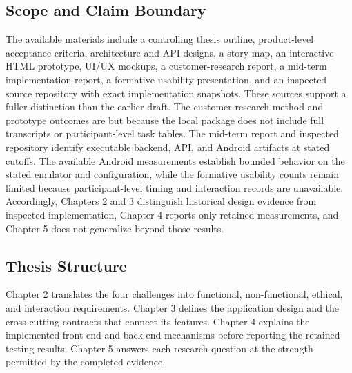 \subsection{Scope and Claim Boundary}

The available materials include a controlling thesis outline, product-level acceptance criteria, architecture and API designs, a story map, an interactive HTML prototype, UI/UX mockups, a customer-research report, a mid-term implementation report, a formative-usability presentation, and an inspected source repository with exact implementation snapshots.
These sources support a fuller distinction than the earlier draft.
The customer-research method and prototype outcomes are \observed{} but \limited{} because the local package does not include full transcripts or participant-level task tables.
The mid-term report and inspected repository identify executable backend, API, and Android artifacts at stated cutoffs.
The available Android measurements establish bounded behavior on the stated emulator and configuration, while the formative usability counts remain limited because participant-level timing and interaction records are unavailable.
Accordingly, Chapters 2 and 3 distinguish historical design evidence from inspected implementation, Chapter 4 reports only retained measurements, and Chapter 5 does not generalize beyond those results.

\subsection{Thesis Structure}

Chapter 2 translates the four challenges into functional, non-functional, ethical, and interaction requirements.
Chapter 3 defines the application design and the cross-cutting contracts that connect its features.
Chapter 4 explains the implemented front-end and back-end mechanisms before reporting the retained testing results.
Chapter 5 answers each research question at the strength permitted by the completed evidence.

